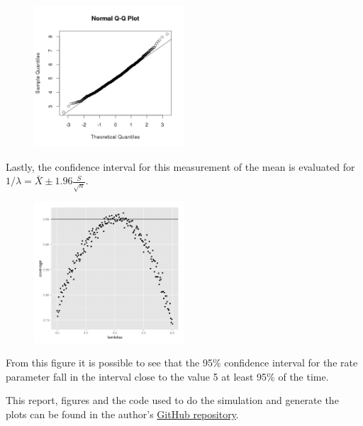 \documentclass[a4paper]{article}
\begin{document}
\begin{figure}[h!]
\centering
\includegraphics[width = 0.5\textwidth]{qqplot_part_1.png}
\end{figure}

Lastly, the confidence interval for this measurement of the mean is evaluated for $1/\lambda = \bar{X} \pm 1.96\frac{S}{\sqrt{n}}$.

\begin{figure}[h!]
\centering
\includegraphics[width = 0.5\textwidth]{confidence_part_1.png}
\end{figure}

From this figure it is possible to see that the 95\% confidence interval for the rate parameter fall in the interval close to the value 5 at least 95\% of the time.

This report, figures and the code used to do the simulation and generate the plots can be found in the author's \href{https://github.com/franchenstein/statistical_inference}{GitHub repository}.
\end{document}
